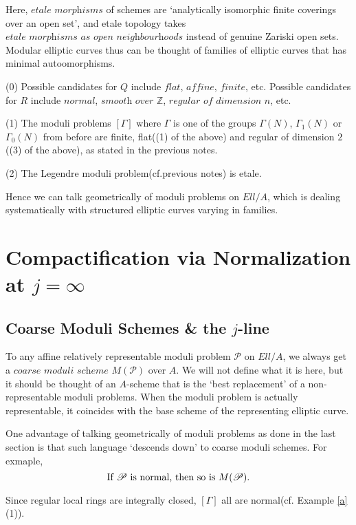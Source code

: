 \documentclass[a4paper,11pt]{article}
\begin{document}
Here, $\textit{etale morphisms}$ of schemes are `analytically isomorphic finite coverings over an open set', and etale topology takes $\textit{etale morphisms as open neighbourhoods}$ instead of genuine Zariski open sets.
Modular elliptic curves thus can be thought of families of elliptic curves that has minimal autoomorphisms.

\begin{exm}\label{a}
(0) Possible candidates for $Q$ include $\textit{flat}$, $\textit{affine}$, $\textit{finite}$, etc.
Possible candidates for $R$ include $\textit{normal}$, $\textit{smooth over }\mathbb{Z}$, $\textit{regular of dimension }n$, etc.

(1) The moduli problems $[\Gamma]$ where $\Gamma$ is one of the groups $\Gamma(N)$, $\Gamma_1(N)$ or $\Gamma_0(N)$ from before are finite, flat((1) of the above) and regular of dimension $2$((3) of the above), as stated in the previous notes.

(2) The Legendre moduli problem(cf.previous notes) is etale.
\end{exm}

Hence we can talk geometrically of moduli problems on $Ell/A$, which is dealing systematically with structured elliptic curves varying in families.

\section{Compactification via Normalization at $j=\infty$}

\subsection{Coarse Moduli Schemes \& the $j$-line}

To any affine relatively representable moduli problem $\mathcal{P}$ on $Ell/A$, we always get a $\textit{coarse moduli scheme}$ $M(\mathcal{P})$ over $A$.
We will not define what it is here, but it should be thought of an $A$-scheme that is the `best replacement' of a non-representable moduli problems.
When the moduli problem is actually representable, it coincides with the base scheme of the representing elliptic curve.

One advantage of talking geometrically of moduli problems as done in the last section is that such language `descends down' to coarse moduli schemes.
For exmaple,
\[
\textnormal{If } \mathcal{P} \textnormal{ is normal, then so is } M(\mathcal{P}).
\]

\begin{rem}\label{b}
Since regular local rings are integrally closed, $[\Gamma]$ all are normal(cf. Example \ref{a}(1)).
\end{rem}
\end{document}
